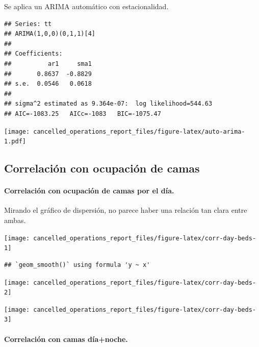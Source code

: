 \documentclass[
]{article}
\begin{document}
Se aplica un ARIMA automático con estacionalidad.

\begin{verbatim}
## Series: tt 
## ARIMA(1,0,0)(0,1,1)[4] 
## 
## Coefficients:
##          ar1     sma1
##       0.8637  -0.8829
## s.e.  0.0546   0.0618
## 
## sigma^2 estimated as 9.364e-07:  log likelihood=544.63
## AIC=-1083.25   AICc=-1083   BIC=-1075.47
\end{verbatim}

\texttt{[image: cancelled\_operations\_report\_files/figure-latex/auto-arima-1.pdf]}

\hypertarget{correlaciuxf3n-con-ocupaciuxf3n-de-camas}{%
\subsection{Correlación con ocupación de
camas}\label{correlaciuxf3n-con-ocupaciuxf3n-de-camas}}

\hypertarget{correlaciuxf3n-con-ocupaciuxf3n-de-camas-por-el-duxeda.}{%
\paragraph{Correlación con ocupación de camas por el
día.}\label{correlaciuxf3n-con-ocupaciuxf3n-de-camas-por-el-duxeda.}}

Mirando el gráfico de dispersión, no parece haber una relación tan clara
entre ambas.

\begin{center}\texttt{[image: cancelled\_operations\_report\_files/figure-latex/corr-day-beds-1]} \end{center}

\begin{verbatim}
## `geom_smooth()` using formula 'y ~ x'
\end{verbatim}

\begin{center}\texttt{[image: cancelled\_operations\_report\_files/figure-latex/corr-day-beds-2]} \end{center}

\begin{center}\texttt{[image: cancelled\_operations\_report\_files/figure-latex/corr-day-beds-3]} \end{center}

\hypertarget{correlaciuxf3n-con-camas-duxedanoche.}{%
\paragraph{Correlación con camas
día+noche.}\label{correlaciuxf3n-con-camas-duxedanoche.}}
\end{document}
